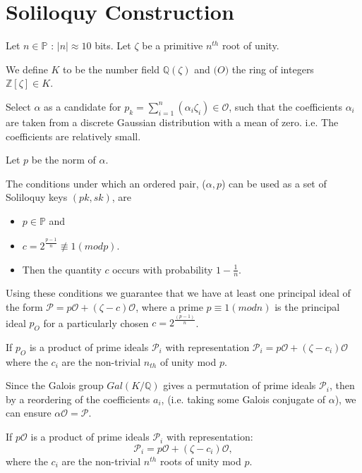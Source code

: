 \section{Soliloquy Construction}


Let $n \in \mathbb{P}$ : $|n| \approx 10$ bits.
Let $\zeta$ be a primitive $n^{th}$ root of unity.

We define $K$ to be the number field $\mathbb{Q}(\zeta)$ and $\mathcal(O)$ the ring of integers $\mathbb{Z} [\zeta ] \in K$. 

Select $\alpha$ as a candidate for $p_{k} = \sum_{i=1}^{n} (\alpha_{i} \zeta_{i}) \in \mathcal{O}$, such that the coefficients $\alpha_{i}$ are taken from a discrete Gaussian distribution with a mean of zero.  
i.e. The coefficients are relatively small. 

Let $p$ be the norm of $\alpha$.

The conditions under which an ordered pair, ($\alpha, p$) can be used as a set of Soliloquy keys $(pk, sk)$, are 
\begin{itemize}
\item $p \in \mathbb{P}$  and 
\item $c=2^{\frac{p-1}{n}} \not\equiv 1(mod p)$.
\item Then the quantity $c$ occurs with probability $1-\frac{1}{n}$. 
\end{itemize}

Using these conditions we guarantee that we have at least one principal ideal of the form  $\mathcal{P} = p \mathcal{O} + (\zeta-c) \mathcal{O}$, where a prime $p \equiv 1(mod n)$ is the principal ideal $p_{O}$  for a particularly chosen $c = 2^{\frac{(p-1)}{n}}$. 

If $p_{O}$ is a product of prime ideals $\mathcal{P}_{i}$ with representation $\mathcal{P}_{i} = p\mathcal{O} + (\zeta-c_{i}) \mathcal{O}$ where the $c_{i}$ are the non-trivial $n_{th}$ of unity mod $p$. 

Since the Galois group $Gal(K/\mathbb{Q})$ gives a permutation of prime ideals $\mathcal{P}_{i}$, then by a reordering of the coefficients $a_{i}$, (i.e. taking some Galois conjugate of $\alpha$), we can ensure $\alpha \mathcal{O} = \mathcal{P}$. 

If $p \mathcal{O}$ is a product of prime ideals $\mathcal{P}_{i}$ with representation:  
\[\mathcal{P}_{i} = p\mathcal{O} + (\zeta-c_{i}) \mathcal{O},\]
 where the $c_{i}$ are the non-trivial $n^{th}$ roots of unity mod $p$. 
  
